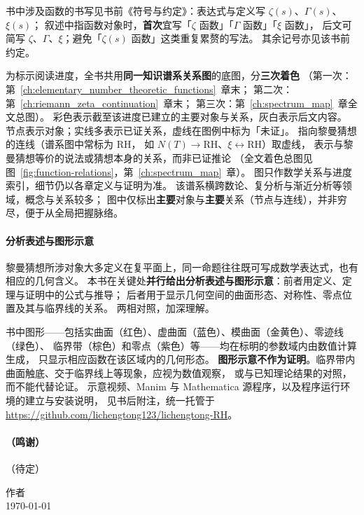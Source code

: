 书中涉及函数的书写见书前《符号与约定》：表达式与定义写 $\zeta(s)$、$\Gamma(s)$、$\xi(s)$；
叙述中指函数对象时，\textbf{首次}宜写「$\zeta$ 函数」「$\Gamma$ 函数」「$\xi$ 函数」，
后文可简写 $\zeta$、$\Gamma$、$\xi$；避免「$\zeta(s)$ 函数」这类重复累赘的写法。
其余记号亦见该书前约定。

为标示阅读进度，全书共用\textbf{同一知识谱系关系图}的底图，分\textbf{三次着色}
（第一次：第~\ref{ch:elementary_number_theoretic_functions}~章末；
第二次：第~\ref{ch:riemann_zeta_continuation}~章末；
第三次：第~\ref{ch:spectrum_map}~章全文总图）。
彩色表示截至该进度已建立的主要对象与关系，灰白表示后文内容。
节点表示对象；实线多表示已证关系，虚线在图例中标为「未证」。
指向黎曼猜想的连线（谱系图中常标为 $\mathrm{RH}$，
如 $N(T)\to\mathrm{RH}$、$\xi\leftrightarrow\mathrm{RH}$）取虚线，
表示与黎曼猜想等价的说法或猜想本身的关系，而非已证推论
（全文着色总图见图~\ref{fig:function-relations}，第~\ref{ch:spectrum_map}~章）。
图只作数学关系与进度索引，细节仍以各章定义与证明为准。
该谱系横跨数论、复分析与渐近分析等领域，概念与关系较多；
图中仅标出\textbf{主要}对象与\textbf{主要}关系（节点与连线），并非穷尽，便于从全局把握脉络。

\paragraph{分析表述与图形示意}
黎曼猜想所涉对象大多定义在复平面上，同一命题往往既可写成数学表达式，也有相应的几何含义。
本书在关键处\textbf{并行给出分析表述与图形示意}：前者用定义、定理与证明中的公式与推导；
后者用于显示几何空间的曲面形态、对称性、零点位置及其与临界线的关系。
两相对照，加深理解。

书中图形——包括实曲面（红色）、虚曲面（蓝色）、模曲面（金黄色）、零迹线（绿色）、
临界带（棕色）和零点（紫色）等——均在标明的参数域内由数值计算生成，
只显示相应函数在该区域内的几何形态。
\textbf{图形示意不作为证明}。临界带内曲面触底、交于临界线上等现象，应视为数值观察，
或与已知理论结果的对照，而不能代替论证。
示意视频、Manim 与 Mathematica 源程序，以及程序运行环境的建立与安装说明，
见书后附注，统一托管于
\url{https://github.com/lichengtong123/lichengtong-RH}。

\paragraph{（鸣谢）}
（待定）

\vspace{1.5em}
\begin{flushright}
作者\\
\today
\end{flushright}

\clearpage
